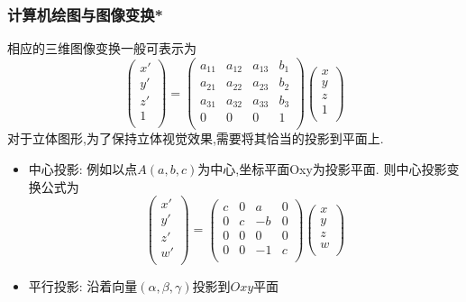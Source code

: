\begin{frame}\frametitle{计算机绘图与图像变换*}
    相应的三维图像变换一般可表示为
    \begin{equation*}
    \begin{pmatrix}x'\\y'\\z'\\1\\\end{pmatrix}=
    \begin{pmatrix}
    a_{11}&a_{12}&a_{13}&b_{1}\\
    a_{21}&a_{22}&a_{23}&b_{2}\\
    a_{31}&a_{32}&a_{33}&b_{3}\\
    0&0&0&1\\
    \end{pmatrix}
    \begin{pmatrix}x\\y\\z\\1\\\end{pmatrix}
    \end{equation*}
    对于立体图形,为了保持立体视觉效果,需要将其恰当的投影到平面上.
    \begin{itemize}
    \item 中心投影: 例如以点$A(a,b,c)$为中心,坐标平面Oxy为投影平面. 则中心投影变换公式为
    \begin{equation*}
    \begin{pmatrix}x'\\y'\\z'\\w'\\\end{pmatrix}=
    \begin{pmatrix}
    c&0&a&0\\0&c&-b&0\\0&0&0&0\\0&0&-1&c\\
    \end{pmatrix}
    \begin{pmatrix}x\\y\\z\\w\\\end{pmatrix}
    \end{equation*}
    \item 平行投影: 沿着向量$(\alpha,\beta,\gamma)$投影到$Oxy$平面
    \begin{equation*}

\end{equation*}
\end{itemize}
\end{frame}
